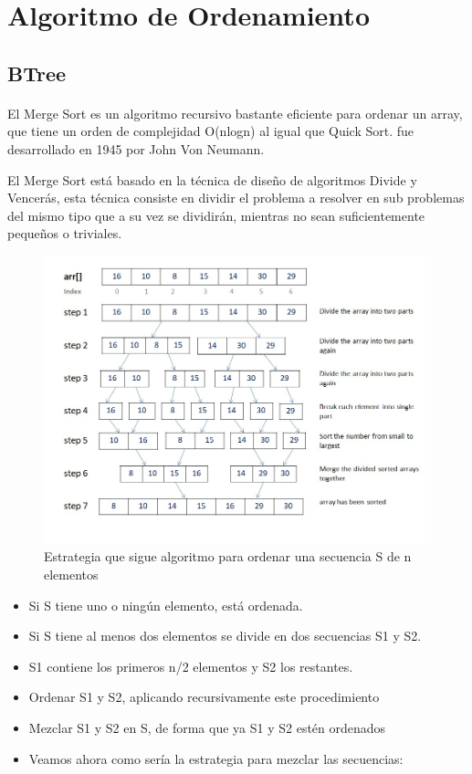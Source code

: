 \documentclass{article}
\begin{document}
	\section{Algoritmo de Ordenamiento}\label{sec:ejercicios}



     \subsection{BTree}
    \paragraph{}
    El Merge Sort es un algoritmo recursivo bastante eficiente para ordenar un array, que tiene un orden de complejidad O(nlogn) al igual que Quick Sort. fue desarrollado en 1945 por John Von Neumann.

    El Merge Sort está basado en la técnica de diseño de algoritmos Divide y Vencerás, esta técnica consiste en dividir el problema a resolver en sub problemas del mismo tipo que a su vez se dividirán, mientras no sean suficientemente  pequeños o triviales.
    \begin{figure}[h!]
        \centering
        \includegraphics[width=12cm]{img/mergesort.png}
        \caption{Estrategia que sigue algoritmo para ordenar una secuencia S de n elementos}
        \label{fig:mergesort}
    \end {figure}
    \begin{itemize}
        \item Si S tiene uno o ningún elemento, está ordenada.
        \item Si S tiene al menos dos elementos se divide en dos secuencias S1 y S2.
        \item S1 contiene los primeros n/2 elementos y S2 los restantes.
        \item Ordenar S1 y S2, aplicando recursivamente este procedimiento
        \item Mezclar S1 y S2 en S, de forma que ya S1 y S2 estén ordenados
        \item Veamos ahora como sería la estrategia para mezclar las secuencias:
    \end{itemize}
\end{document}
